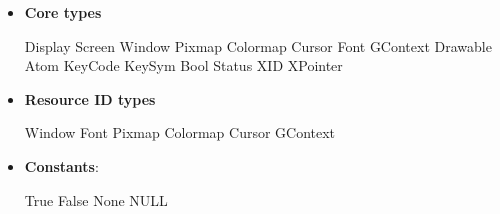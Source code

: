 \documentclass{report}
\begin{document}
    \pagebreak 
    \begin{itemize}
        \item \textbf{Core types}
            \bigbreak \noindent 
            \begin{cppcode}
                Display
                Screen
                Window
                Pixmap
                Colormap
                Cursor
                Font
                GContext
                Drawable
                Atom
                KeyCode
                KeySym
                Bool
                Status
                XID
                XPointer
            \end{cppcode}

        \item \textbf{Resource ID types}
            \bigbreak \noindent 
            \begin{cppcode}
                Window
                Font
                Pixmap
                Colormap
                Cursor
                GContext
            \end{cppcode}
        \item \textbf{Constants}: 
            \bigbreak \noindent 
            \begin{cppcode}
                True
                False
                None
                NULL
            \end{cppcode}
    \end{itemize}
\end{document}
